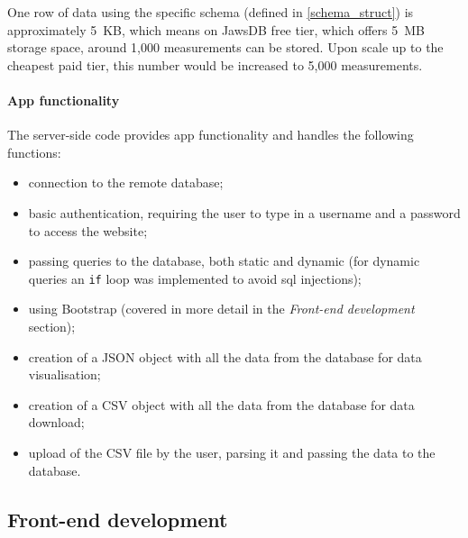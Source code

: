 One row of data using the specific schema (defined in \cref{schema_struct}) is approximately \SI{5}{KB}, which means on JawsDB free tier, which offers \SI{5}{MB} storage space, around 1,000 measurements can be stored. Upon scale up to the cheapest paid tier, this number would be increased to 5,000 measurements.

\paragraph{App functionality}

The server-side code provides app functionality and handles the following functions:
\begin{itemize}
    \item connection to the remote database;
    \item basic authentication, requiring the user to type in a username and a password to access the website;
    \item passing queries to the database, both static and dynamic (for dynamic queries an \texttt{if} loop was implemented to avoid \gls{sql} injections);
    \item using Bootstrap (covered in more detail in the \textit{Front-end development} section);
    \item creation of a JSON object with all the data from the database for data visualisation;
    \item creation of a CSV object with all the data from the database for data download;
    \item upload of the CSV file by the user, parsing it and passing the data to the database.
\end{itemize}

\subsection{Front-end development}


